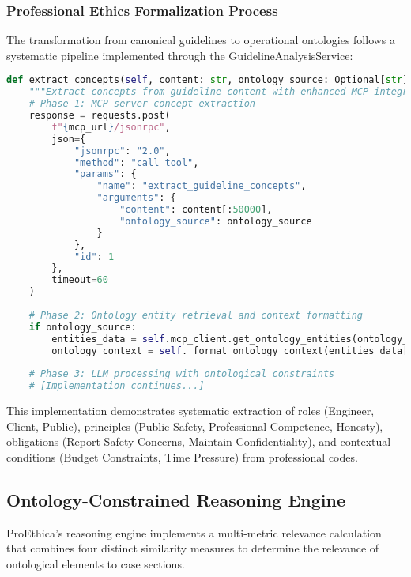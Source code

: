 \subsubsection{Professional Ethics Formalization Process}

The transformation from canonical guidelines to operational ontologies follows a systematic pipeline implemented through the GuidelineAnalysisService:

\begin{lstlisting}[language=Python, caption=Concept Extraction with MCP Integration]
def extract_concepts(self, content: str, ontology_source: Optional[str] = None) -> Dict[str, Any]:
    """Extract concepts from guideline content with enhanced MCP integration."""
    # Phase 1: MCP server concept extraction
    response = requests.post(
        f"{mcp_url}/jsonrpc",
        json={
            "jsonrpc": "2.0",
            "method": "call_tool",
            "params": {
                "name": "extract_guideline_concepts",
                "arguments": {
                    "content": content[:50000],
                    "ontology_source": ontology_source
                }
            },
            "id": 1
        },
        timeout=60
    )
    
    # Phase 2: Ontology entity retrieval and context formatting
    if ontology_source:
        entities_data = self.mcp_client.get_ontology_entities(ontology_source)
        ontology_context = self._format_ontology_context(entities_data["entities"])
    
    # Phase 3: LLM processing with ontological constraints
    # [Implementation continues...]
\end{lstlisting}

This implementation demonstrates systematic extraction of roles (Engineer, Client, Public), principles (Public Safety, Professional Competence, Honesty), obligations (Report Safety Concerns, Maintain Confidentiality), and contextual conditions (Budget Constraints, Time Pressure) from professional codes.

\subsection{Ontology-Constrained Reasoning Engine}

ProEthica's reasoning engine implements a multi-metric relevance calculation that combines four distinct similarity measures to determine the relevance of ontological elements to case sections.

